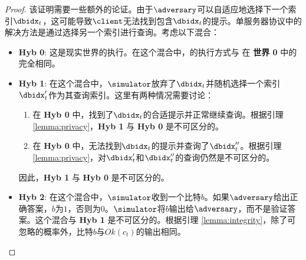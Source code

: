 \begin{proof}
    该证明需要一些额外的论证。由于$\adversary$可以自适应地选择下一个索引$\dbidx_t$，这可能导致$\client$无法找到包含$\dbidx_t$的提示。单服务器协议中的解决方法是通过选择另一个索引进行查询。考虑以下混合：
    
    \begin{itemize}
        \item \textbf{Hyb 0}: 这是现实世界的执行。在这个混合中，\simulator 的执行方式与 \client 在 \textbf{世界 0} 中的完全相同。
        \item \textbf{Hyb 1}: 在这个混合中，$\simulator$放弃了$\dbidx_t$并随机选择一个索引$\dbidx_t'$作为其查询索引。这里有两种情况需要讨论：
        \begin{enumerate}
            \item 在 \textbf{Hyb 0} 中，\simulator 找到了$\dbidx_t$的合适提示并正常继续查询。根据引理 \ref{lemma:privacy}，\textbf{Hyb 1} 与 \textbf{Hyb 0} 是不可区分的。
            \item 在 \textbf{Hyb 0} 中，\simulator 无法找到$\dbidx_t$的提示并查询了$\dbidx_t''$。根据引理 \ref{lemma:privacy}，对$\dbidx_t'$和$\dbidx_t''$的查询仍然是不可区分的。
        \end{enumerate}
        因此，\textbf{Hyb 1} 与 \textbf{Hyb 0} 是不可区分的。
        \item \textbf{Hyb 2}: 在这个混合中，$\simulator$收到一个比特$b$。如果$\adversary$给出正确答案，$b$为$1$，否则为$0$。$\simulator$将$b$输出给$\adversary$，而不是验证答案。这个混合与 \textbf{Hyb 1} 是不可区分的。根据引理 \ref{lemma:integrity}，除了可忽略的概率外，比特$b$与$Ok(c_t)$的输出相同。
    \end{itemize}
\end{proof}